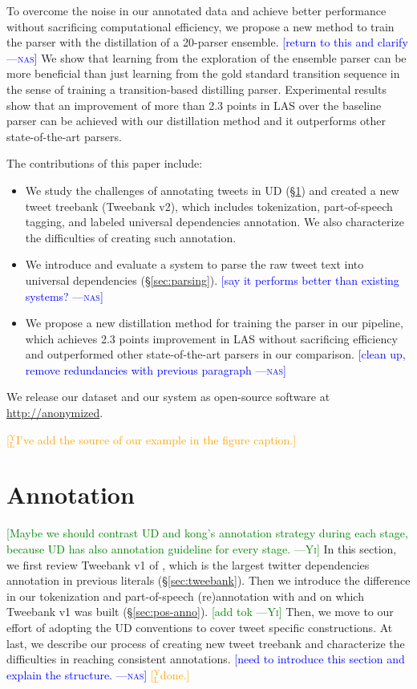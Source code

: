 \documentclass[11pt,a4paper]{article}
\newcommand{\yjcomment}[1]{\textcolor{orange}{[$_\mathrm{L}^\mathrm{Y}$#1]}}
\newcommand{\nascomment}[1]{\textcolor{blue}{[#1 ---\textsc{nas}]}}
\newcommand{\yicomment}[1]{\textcolor{green}{[#1 ---\textsc{Yi}]}}
\begin{document}
To overcome the noise in our annotated data and achieve better performance
without sacrificing computational efficiency, we propose a new method to
train the parser with the distillation 
\cite{DBLP:journals/corr/HintonVD15} of a 20-parser
ensemble. \nascomment{return to this and clarify}
We show that learning from the exploration of the ensemble parser
can be more beneficial than just learning from the gold standard
transition sequence in the sense of training a transition-based
distilling parser. Experimental results show that an improvement of more
than 2.3 points in LAS over the baseline parser can be achieved with our
distillation method and it outperforms other state-of-the-art parsers.

The contributions of this paper include:
\begin{itemize}
\item We study the challenges of annotating tweets in UD (\S\ref{sec:anno})
and created a new tweet treebank ({\sc Tweebank v2}), which includes 
tokenization, part-of-speech tagging, and labeled universal dependencies annotation.
We also characterize the difficulties of creating such annotation.

\item We introduce and evaluate a system to parse the raw tweet text into
universal dependencies (\S\ref{sec:parsing}).  \nascomment{say it
  performs better than existing systems?}
\item We propose a new distillation
method for training the parser in our pipeline,  which achieves 2.3 points improvement in LAS
without sacrificing efficiency and outperformed other state-of-the-art parsers
in our comparison. \nascomment{clean up, remove redundancies with
  previous paragraph}
\end{itemize}

We release our dataset and our system as open-source software at
\url{http://anonymized}. 

\yjcomment{I've add the source of our example in the figure caption.}
\section{Annotation}\label{sec:anno}
\yicomment{Maybe we should contrast UD and kong's annotation strategy during each stage, because UD has also annotation guideline for every stage.}
In this section, we first review {\sc Tweebank v1} of \citet{kong-EtAl:2014:EMNLP2014},
which is the largest twitter dependencies annotation in previous literals (\S\ref{sec:tweebank}).
Then we introduce the difference in our tokenization and part-of-speech (re)annotation with \citet{ICWSM101540} and 
\citet{gimpel-EtAl:2011:ACL-HLT2011} on which {\sc Tweebank v1} was built (\S\ref{sec:pos-anno}). \yicomment{add tok} 
Then, we move to our effort of adopting the
UD conventions to cover tweet specific constructions. 
At last, we describe our process of creating new tweet treebank and characterize
the difficulties in reaching consistent annotations.
\nascomment{need to introduce this section and explain the structure.}
\yjcomment{done.}
\end{document}
